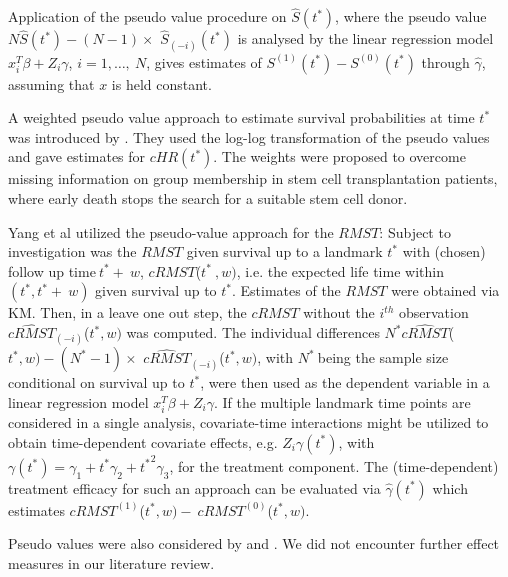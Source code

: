 \noindent 

\noindent Application of the pseudo value procedure on $\hat{S}(t^*)$, where the pseudo value $N\hat{S}\left(t^*\right)-\left(N-1\right)\times$ ${\hat{S}}_{\left(-i\right)}(t^*)$ is analysed by the linear regression model $x^T_i\beta +Z_i\gamma $, $i=1,\dots ,\ N$,  gives estimates of $S^{\left(1\right)}\left(t^*\right)-S^{\left(0\right)}(t^*)$ through $\widehat{\gamma }$, assuming that $x$ is held constant.

\noindent 

\noindent A weighted pseudo value approach to estimate survival probabilities at time $t^*$ was introduced by \cite{Mittlbock.2022}. They used the log-log transformation of the pseudo values and gave estimates for $cHR\left(t^*\right)$. The weights were proposed to overcome missing information on group membership in stem cell transplantation patients, where early death stops the search for a suitable stem cell donor.

\noindent 

\noindent Yang et al \cite{Yang.2021} utilized the pseudo-value approach for the $RMST$: Subject to investigation was the $RMST$ given survival up to a landmark $t^*$ with (chosen) follow up time$\ t^*+\ w$, $cRMST$($t^*\ ,w)$, i.e. the expected life time within $(t^*,t^*+\ w)$ given survival up to $t^*$. Estimates of the $RMST$ were obtained via KM. Then, in a leave one out step, the $cRMST$ without the $i^{th}$ observation ${\widehat{cRMST}}_{(-i)}$($t^*,w)$ was computed. 
The individual differences $N^*\widehat{cRMST}$($t^*,w)-\left(N^*-1\right)\times$ ${\widehat{cRMST}}_{(-i)}$($t^*,w)$, with $N^*\ $being the sample size conditional on survival up to $t^*$, were then used as the dependent variable in a linear regression model $x^T_i\beta +Z_i\gamma $. 
If the multiple landmark time points are considered in a single analysis, covariate-time interactions might be utilized to obtain time-dependent covariate effects, e.g. $Z_i\gamma (t^*)$, with $\gamma(t^*) = \gamma_1 + t^*\gamma_2 +{t^*}^2 \gamma_3$, for the treatment component. 
The (time-dependent) treatment efficacy for such an approach can be evaluated via $\widehat{\gamma }(t^*)$ which estimates $cRMST^{\left(1\right)}$($t^*,w)-\ cRMST^{\left(0\right)}$($t^*,w)$.

\noindent 

\noindent Pseudo values were also considered by \cite{Potschger.2018} and \cite{Li.2020}. We did not encounter further effect measures in our literature review.

